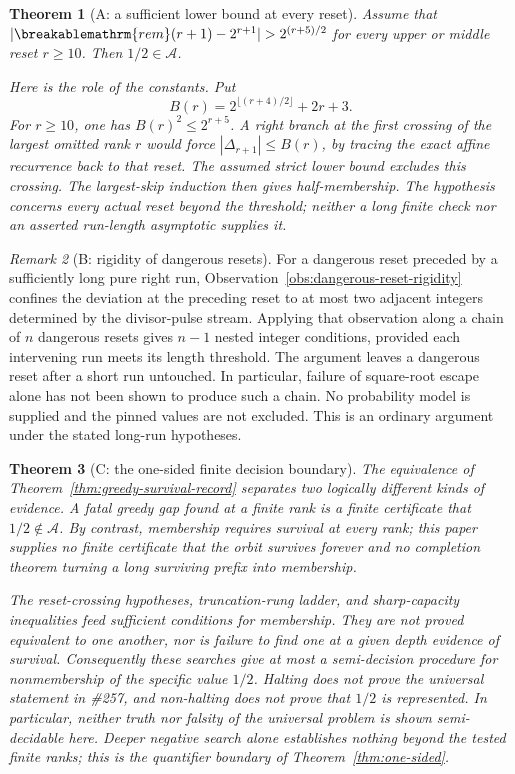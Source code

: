 \documentclass[11pt]{article}
\theoremstyle{plain}
\newtheorem{thm}{Theorem}[section]
\theoremstyle{definition}
\theoremstyle{remark}
\newtheorem{rem}[thm]{Remark}
\renewcommand{\mathrm}[1]{\ifmmode\breakablemathrm{#1}\else\textrm{#1}\fi}%
\begin{document}
\begin{thm}[A: a sufficient lower bound at every reset]\label{thm:lower-bound-every-reset}
Assume that
$|\mathrm{rem}(r+1)-2^{r+1}|>2^{(r+5)/2}$ for every upper or
middle reset $r\ge10$.  Then $1/2\in\mathcal A$.

Here is the role of the constants.  Put
\[
 B(r)=2^{\lfloor(r+4)/2\rfloor}+2r+3.
\]
For $r\ge10$, one has $B(r)^2\le2^{r+5}$.
A right branch at the first crossing of the largest omitted rank $r$
would force $|\Delta_{r+1}|\le B(r)$, by tracing the exact affine
recurrence back to that reset.  The assumed strict lower bound
excludes this crossing.  The largest-skip induction then gives
half-membership.  The hypothesis concerns every actual reset beyond
the threshold; neither a long finite check nor an asserted
run-length asymptotic supplies it.
\end{thm}

\begin{rem}[B: rigidity of dangerous resets]
\label{rem:dangerous-reset-chain-scope}
For a dangerous reset preceded by a sufficiently long pure right run,
Observation~\ref{obs:dangerous-reset-rigidity} confines the deviation at
the preceding reset to at most two adjacent integers determined by the
divisor-pulse stream. Applying that observation along a chain of $n$
dangerous resets gives $n-1$ nested integer conditions, provided each
intervening run meets its length threshold. The argument leaves a
dangerous reset after a short run untouched. In particular, failure of
square-root escape alone has not been shown to produce such a chain.
No probability model is supplied and the pinned values are not excluded.
This is an ordinary argument under the stated long-run hypotheses.
\end{rem}

\begin{thm}[C: the one-sided finite decision boundary]\label{thm:one-sided-finite-decision-boundary}
The equivalence of Theorem~\ref{thm:greedy-survival-record} separates two logically different kinds of evidence. A fatal greedy gap found at a finite rank is
a finite certificate that $1/2\notin\mathcal A$. By contrast, membership requires survival at
every rank; this paper supplies no finite certificate that the orbit survives forever and no
completion theorem turning a long surviving prefix into membership.

The reset-crossing hypotheses, truncation-rung ladder, and sharp-capacity inequalities feed
sufficient conditions for membership. They are not proved equivalent to one another,
nor is failure to find one at a given depth evidence of survival. Consequently these searches
give at most a semi-decision procedure for \emph{nonmembership of the specific value $1/2$}.
Halting does not prove the universal statement in \#257, and non-halting does not prove that
$1/2$ is represented. In particular, neither truth nor falsity of the universal problem is
shown semi-decidable here. Deeper negative search alone establishes nothing beyond the tested
finite ranks; this is the quantifier boundary of Theorem~\ref{thm:one-sided}.
\end{thm}
\end{document}
